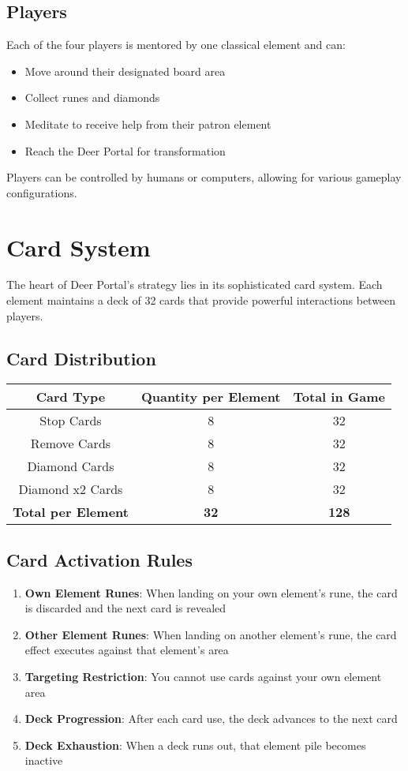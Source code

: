 \documentclass[12pt,a4paper]{article}
\begin{document}
\subsection{Players}
Each of the four players is mentored by one classical element and can:
\begin{itemize}
    \item Move around their designated board area
    \item Collect runes and diamonds
    \item Meditate to receive help from their patron element
    \item Reach the Deer Portal for transformation
\end{itemize}

Players can be controlled by humans or computers, allowing for various gameplay configurations.

\section{Card System}

The heart of Deer Portal's strategy lies in its sophisticated card system. Each element maintains a deck of 32 cards that provide powerful interactions between players.

\subsection{Card Distribution}
\begin{center}
\begin{tabular}{|c|c|c|}
\hline
\textbf{Card Type} & \textbf{Quantity per Element} & \textbf{Total in Game} \\
\hline
Stop Cards & 8 & 32 \\
Remove Cards & 8 & 32 \\
Diamond Cards & 8 & 32 \\
Diamond x2 Cards & 8 & 32 \\
\hline
\textbf{Total per Element} & \textbf{32} & \textbf{128} \\
\hline
\end{tabular}
\end{center}

\subsection{Card Activation Rules}
\begin{enumerate}
    \item \textbf{Own Element Runes}: When landing on your own element's rune, the card is discarded and the next card is revealed
    \item \textbf{Other Element Runes}: When landing on another element's rune, the card effect executes against that element's area
    \item \textbf{Targeting Restriction}: You cannot use cards against your own element area
    \item \textbf{Deck Progression}: After each card use, the deck advances to the next card
    \item \textbf{Deck Exhaustion}: When a deck runs out, that element pile becomes inactive
\end{enumerate}
\end{document}

